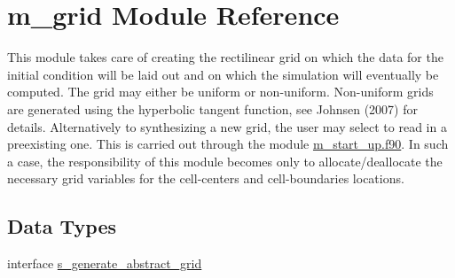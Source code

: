 \hypertarget{namespacem__grid}{}\section{m\+\_\+grid Module Reference}
\label{namespacem__grid}


This module takes care of creating the rectilinear grid on which the data for the initial condition will be laid out and on which the simulation will eventually be computed. The grid may either be uniform or non-\/uniform. Non-\/uniform grids are generated using the hyperbolic tangent function, see Johnsen (2007) for details. Alternatively to synthesizing a new grid, the user may select to read in a preexisting one. This is carried out through the module \hyperlink{m__start__up_8f90}{m\+\_\+start\+\_\+up.\+f90}. In such a case, the responsibility of this module becomes only to allocate/deallocate the necessary grid variables for the cell-\/centers and cell-\/boundaries locations.  


\subsection*{Data Types}
\begin{DoxyCompactItemize}
\item 
interface \hyperlink{interfacem__grid_1_1s__generate__abstract__grid}{s\+\_\+generate\+\_\+abstract\+\_\+grid}
\end{DoxyCompactItemize}

